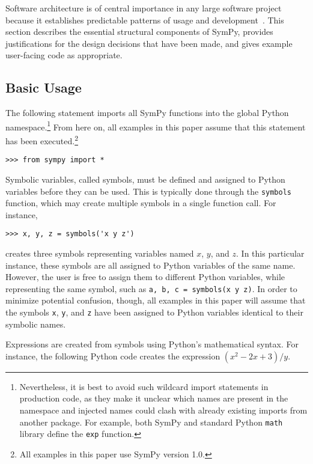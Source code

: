 Software architecture is of central importance in any large software
project because it establishes predictable patterns of usage and
development~\cite{Shaw1996}. This section describes the essential
structural components of SymPy, provides justifications for the design
decisions that have been made, and gives example
user-facing code as appropriate.

\subsection{Basic Usage}


The following statement
imports all SymPy functions into the global Python namespace.\footnote{
Nevertheless, it is best to avoid such wildcard import statements
in production code, as they make it unclear which names are present
in the namespace and injected names could clash with already existing
imports from another package.  For example, both SymPy and standard
Python \texttt{math} library define the \texttt{exp} function.}
From here on, all examples in this paper assume that this statement has been
executed.\footnote{All examples in this paper use SymPy version 1.0.}

\begin{verbatim}
>>> from sympy import *
\end{verbatim}

Symbolic variables, called symbols, must be defined and assigned to
Python variables before they can be used. This is typically done through the
\texttt{symbols} function, which may create multiple symbols in a single
function call. For instance,
\begin{verbatim}
>>> x, y, z = symbols('x y z')
\end{verbatim}
creates three symbols representing variables named $x$, $y$, and $z$. In this
particular instance, these symbols are all assigned to Python variables of the
same name. However, the user is free to assign them to different
Python variables, while representing the same symbol, such as
\texttt{a, b, c = symbols(\textquotesingle{}x y z\textquotesingle{})}.
In order to minimize potential confusion, though, all examples in this paper will
assume that
the symbols \verb|x|, \verb|y|, and \verb|z| have been assigned to Python variables
identical to their symbolic names.

Expressions are created from symbols using Python's mathematical syntax.  For
instance, the following Python code creates the expression $(x^2 - 2x + 3)/y$.

